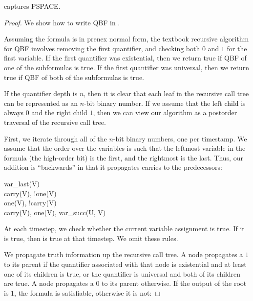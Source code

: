 \begin{lemma}
\label{lem:lang-pspace}
\lang captures PSPACE.
\end{lemma}
\begin{proof}
We show how to write QBF in \lang.

Assuming the formula is in prenex normal form, the textbook recursive algorithm for QBF  involves removing the first quantifier, and checking both $0$ and $1$ for the first variable.  If the first quantifier was existential, then we return true if QBF of one of the subformulas is true.  If the first quantifier was universal, then we return true if QBF of both of the subformulas is true.

If the quantifier depth is $n$, then it is clear that each leaf in the recursive call tree can be represented as an $n$-bit binary number.  If we assume that the left child is always $0$ and the right child $1$, then we can view our algorithm as a postorder traversal of the recursive call tree.

First, we iterate through all of the $n$-bit binary numbers, one per timestamp.  We assume that the order over the variables is such that the leftmost variable in the formula (the high-order bit) is the first, and the rightmost is the last.  Thus, our addition is ``backwards'' in that it propagates carries to the predecessors:

\begin{Drules}
        {var\_last(V)} \\
        {carry(V), !one(V)} \\
        {one(V), !carry(V)} \\
        {carry(V), one(V), var\_succ(U, V)}
\end{Drules}

At each timestep, we check whether the current variable assignment is true.  If it is true, then  is true at that timestep.  We omit these rules.

We propagate truth information up the recursive call tree.  A node propagates a $1$ to its parent if the quantifier associated with that node is existential and at least one of its children is true, or the quantifier is universal and both of its children are true.  A node propagates a $0$ to its parent otherwise.  If the output of the root is $1$, the formula is satisfiable, otherwise it is not: 


\end{proof}
